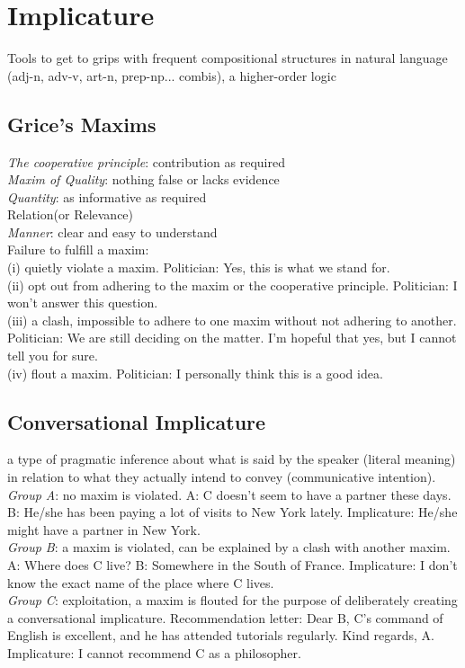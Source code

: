 \section{Implicature}
Tools to get to grips with frequent compositional structures in natural language (adj-n, adv-v, art-n, prep-np... combis), a higher-order logic
\subsection*{Grice's Maxims}
\emph{The cooperative principle}: contribution as required\\
\emph{Maxim of Quality}: nothing false or lacks evidence\\
\emph{Quantity}: as informative as required\\
Relation(or Relevance)\\
\emph{Manner}: clear and easy to understand\\
Failure to fulfill a maxim:\\
(i) quietly violate a maxim. Politician: Yes, this is what we stand for.\\
(ii) opt out from adhering to the maxim or the cooperative principle. Politician: I won’t answer this question.\\
(iii) a clash, impossible to adhere to one maxim without not adhering to another. Politician: We are still deciding on the matter. I’m hopeful that
yes, but I cannot tell you for sure.\\
(iv) flout a maxim. Politician: I personally think this is a good idea.
\subsection*{Conversational Implicature}
a type of pragmatic inference about what is said by the speaker (literal meaning) in relation to what they actually intend to convey (communicative intention).\\
\emph{Group A}: no maxim is violated. {\tiny A: C doesn’t seem to have a partner these days. B: He/she has been paying a lot of visits to New York lately. Implicature: He/she might have a partner in New York.}\\
\emph{Group B}: a maxim is violated, can be explained by a clash with another maxim. {\tiny A: Where does C live? B: Somewhere in the South of France. Implicature: I don’t know the exact name of the place where C lives.}\\
\emph{Group C}: exploitation, a maxim is flouted for the purpose of deliberately creating a conversational implicature. {\tiny Recommendation letter: Dear B, C’s command of English is excellent, and he has attended tutorials regularly. Kind regards, A. Implicature: I cannot recommend C as a philosopher.}\\

